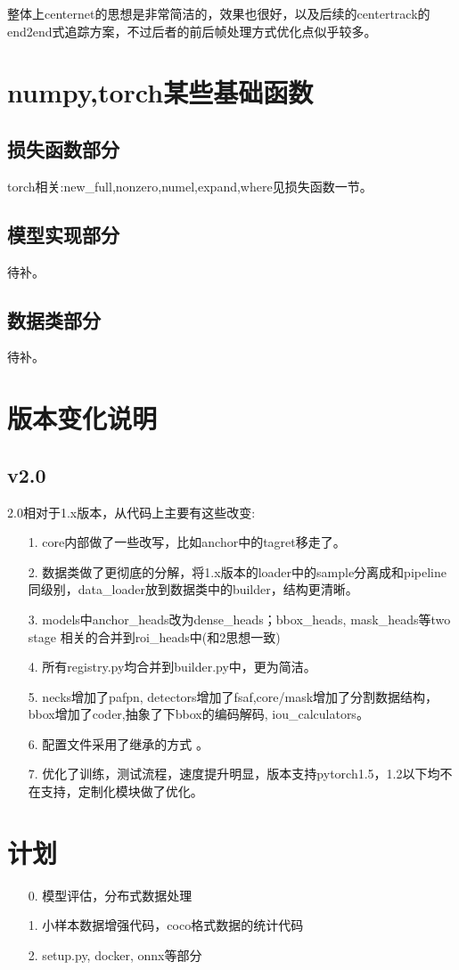 \documentclass[UTF8]{ctexart}
\begin{document}
整体上centernet的思想是非常简洁的，效果也很好，以及后续的centertrack的end2end式追踪方案，不过后者的前后帧处理方式优化点似乎较多。
\section{numpy,torch某些基础函数}
\label{sec:basefunc}
\subsection{损失函数部分}
torch相关:new\_full,nonzero,numel,expand,where见损失函数一节。
\subsection{模型实现部分}
待补。
\subsection{数据类部分}
待补。

\section{版本变化说明}
\subsection{v2.0}
2.0相对于1.x版本，从代码上主要有这些改变:
\begin{itemize}
	\item[1.] core内部做了一些改写，比如anchor中的tagret移走了。
	\item[2.] 数据类做了更彻底的分解，将1.x版本的loader中的sample分离成和pipeline同级别，data\_loader放到数据类中的builder，结构更清晰。
	\item[3.] models中anchor\_heads改为dense\_heads；bbox\_heads, mask\_heads等two stage 相关的合并到roi\_heads中(和2思想一致)
	\item[4.] 所有registry.py均合并到builder.py中，更为简洁。
	\item[5.] necks增加了pafpn, detectors增加了fsaf,core/mask增加了分割数据结构，bbox增加了coder,抽象了下bbox的编码解码, iou\_calculators。
	\item[6.] 配置文件采用了继承的方式 。
	\item[7.] 优化了训练，测试流程，速度提升明显，版本支持pytorch1.5，1.2以下均不在支持，定制化模块做了优化。
\end{itemize}

\section{计划}
\begin{itemize}
	\item [0.]  模型评估，分布式数据处理
	\item [1.] 小样本数据增强代码，coco格式数据的统计代码
	\item [2.] setup.py, docker, onnx等部分
\end{itemize}
\end{document}
